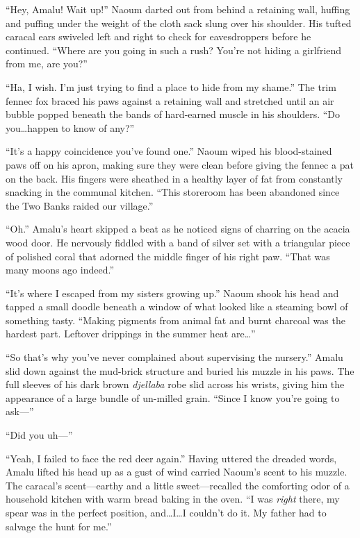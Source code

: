 ``Hey, Amalu! Wait up!'' Naoum darted out from behind a retaining wall, huffing and puffing under the weight of the cloth sack slung over his shoulder. His tufted caracal ears swiveled left and right to check for eavesdroppers before he continued. ``Where are you going in such a rush? You're not hiding a girlfriend from me, are you?''

``Ha, I wish. I'm just trying to find a place to hide from my shame.'' The trim fennec fox braced his paws against a retaining wall and stretched until an air bubble popped beneath the bands of hard-earned muscle in his shoulders. ``Do you\ldots{}happen to know of any?''

``It's a happy coincidence you've found one.'' Naoum wiped his blood-stained paws off on his apron, making sure they were clean before giving the fennec a pat on the back. His fingers were sheathed in a healthy layer of fat from constantly snacking in the communal kitchen. ``This storeroom has been abandoned since the Two Banks raided our village.''

``Oh.'' Amalu's heart skipped a beat as he noticed signs of charring on the acacia wood door. He nervously fiddled with a band of silver set with a triangular piece of polished coral that adorned the middle finger of his right paw. ``That was many moons ago indeed.''

``It's where I escaped from my sisters growing up.'' Naoum shook his head and tapped a small doodle beneath a window of what looked like a steaming bowl of something tasty. ``Making pigments from animal fat and burnt charcoal was the hardest part. Leftover drippings in the summer heat are\ldots''

``So that's why you've never complained about supervising the nursery.'' Amalu slid down against the mud-brick structure and buried his muzzle in his paws. The full sleeves of his dark brown \emph{djellaba} robe slid across his wrists, giving him the appearance of a large bundle of un-milled grain. ``Since I know you're going to ask---''

``Did you uh---''

``Yeah, I failed to face the red deer again.'' Having uttered the dreaded words, Amalu lifted his head up as a gust of wind carried Naoum's scent to his muzzle. The caracal's scent---earthy and a little sweet---recalled the comforting odor of a household kitchen with warm bread baking in the oven. ``I was \emph{right} there, my spear was in the perfect position, and\ldots{}I\ldots{}I couldn't do it. My father had to salvage the hunt for me.''

